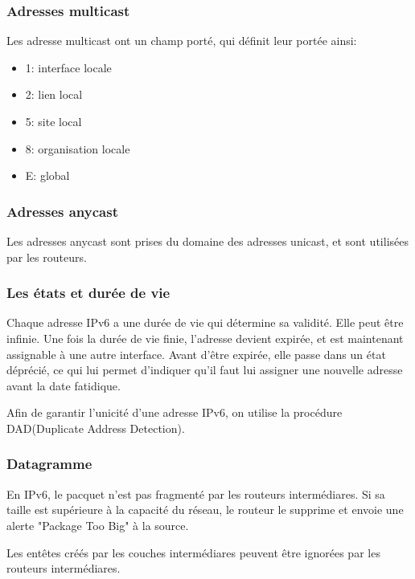 \subsubsection{Adresses multicast}
Les adresse multicast ont un champ porté, qui définit leur portée ainsi:
\begin{itemize}
	\item 1: interface locale
	\item 2: lien local
	\item 5: site local
	\item 8: organisation locale
	\item E: global
\end{itemize}

\subsubsection{Adresses anycast}
Les adresses anycast sont prises du domaine des adresses unicast, et sont utilisées par les routeurs.

\subsubsection{Les états et durée de vie}
Chaque adresse IPv6 a une durée de vie qui détermine sa validité. Elle peut être infinie.
Une fois la durée de vie finie, l'adresse devient expirée, et est maintenant assignable à une autre interface.
Avant d'être expirée, elle passe dans un état déprécié, ce qui lui permet d'indiquer qu'il faut lui assigner
une nouvelle adresse avant la date fatidique.

Afin de garantir l'unicité d'une adresse IPv6, on utilise la procédure DAD(Duplicate Address Detection).

\subsubsection{Datagramme}
En IPv6, le pacquet n'est pas fragmenté par les routeurs intermédiares. Si sa taille est supérieure à la capacité du
réseau, le routeur le supprime et envoie une alerte "Package Too Big" à la source.

Les entêtes créés par les couches intermédiares peuvent être ignorées par les routeurs intermédiares.
